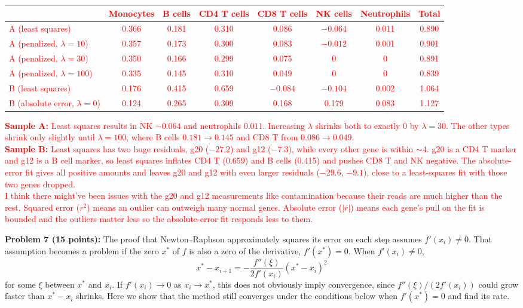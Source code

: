 \documentclass[11pt]{article}
\begin{document}
\textcolor{red}{
\begin{center}
\small
\begin{tabular}{lccccccc}
 & Monocytes & B cells & CD4 T cells & CD8 T cells & NK cells & Neutrophils & Total \\ \hline
A (least squares) & 0.366 & 0.181 & 0.310 & 0.086 & $-0.064$ & 0.011 & 0.890 \\
A (penalized, $\lambda=10$) & 0.357 & 0.173 & 0.300 & 0.083 & $-0.012$ & 0.001 & 0.901 \\
A (penalized, $\lambda=30$) & 0.350 & 0.166 & 0.299 & 0.075 & 0 & 0 & 0.891 \\
A (penalized, $\lambda=100$) & 0.335 & 0.145 & 0.310 & 0.049 & 0 & 0 & 0.839 \\ \hline
B (least squares) & 0.176 & 0.415 & 0.659 & $-0.084$ & $-0.104$ & 0.002 & 1.064 \\
B (absolute error, $\lambda=0$) & 0.124 & 0.265 & 0.309 & 0.168 & 0.179 & 0.083 & 1.127
\end{tabular}
\end{center}
\textbf{Sample A:} Least squares results in NK $-0.064$ and neutrophils $0.011$. Increasing $\lambda$ shrinks both to exactly 0 by $\lambda = 30$. The other types shrink only slightly until $\lambda = 100$, where B cells $0.181 \rightarrow 0.145$ and CD8 T from $0.086 \rightarrow 0.049$.\\
\textbf{Sample B:} Least squares has two huge residuals, g20 ($-27.2$) and g12 ($-7.3$), while every other gene is within $\sim4$. g20 is a CD4 T marker and g12 is a B cell marker, so least squares inflates CD4 T (0.659) and B cells (0.415) and pushes CD8 T and NK negative. The absolute-error fit gives all positive amounts and leaves g20 and g12 with even larger residuals ($-29.6$, $-9.1$), close to a least-squares fit with those two genes dropped.\\
I think there might've been issues with the g20 and g12 measurements like contamination because their reads are much higher than the rest. Squared error ($r^2$) means an outlier can outweigh many normal genes. Absolute error ($|r|$) means each gene's pull on the fit is bounded and the outliers matter less so the absolute-error fit responds less to them.
}

\vspace{0.5em}
{\bf *Problem 7 (15 points):} The proof that Newton--Raphson approximately squares its error
on each step assumes $f'(x_i)\ne0$. That assumption becomes a problem if the zero $x^*$ of $f$ is
also a zero of the derivative, $f'(x^*)=0$. When $f'(x_i)\ne0$,
\[
x^*-x_{i+1}=-\frac{f''(\xi)}{2f'(x_i)}(x^*-x_i)^2
\]
for some $\xi$ between $x^*$ and $x_i$. If $f'(x_i)\to0$ as $x_i\to x^*$, this does not obviously
imply convergence, since $f''(\xi)/(2f'(x_i))$ could grow faster than $x^*-x_i$ shrinks. Here we
show that the method still converges under the conditions below when $f'(x^*)=0$ and find its rate.
\end{document}
